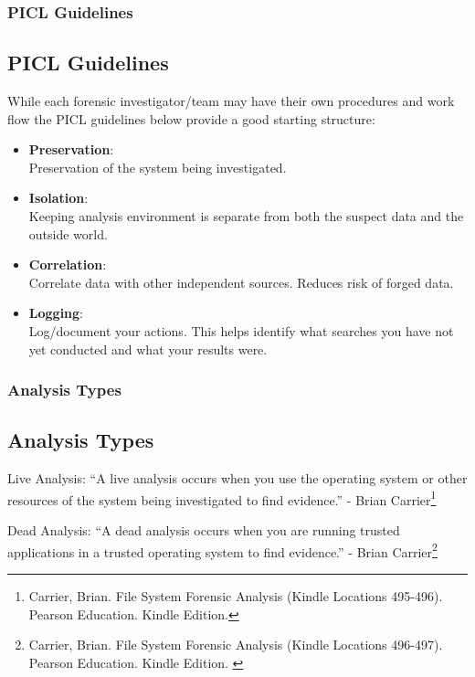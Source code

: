 \documentclass{beamer}
\begin{document}
\begin{frame}
	\frametitle{PICL Guidelines}
	\subsection*{PICL Guidelines}
	While each forensic investigator/team may have their own procedures and work flow the PICL guidelines below provide a good starting structure:\\
	\vspace{\baselineskip}
	\begin{itemize}
		\item \textbf{Preservation}:\\	 Preservation of the system being investigated.
		\item \textbf{Isolation}:\\	 Keeping analysis environment is separate from both the suspect data and the outside world.
		\item \textbf{Correlation}:\\	 Correlate data with other independent sources. Reduces risk of forged data.
		\item \textbf{Logging}:\\	 Log/document your actions. This helps identify what searches you have not yet conducted and what your results were.
	\end{itemize}
\end{frame}

\begin{frame}
	\frametitle{Analysis Types}
	\subsection*{Analysis Types}
	\begin{block}{Live Analysis:}
		``A live analysis occurs when you use the operating system or other resources of the system being investigated to find evidence.'' - Brian Carrier\footnote{\tiny{Carrier, Brian. File System Forensic Analysis (Kindle Locations 495-496). Pearson Education. Kindle Edition.}}
	\end{block}

	\begin{block}{Dead Analysis:}
		``A dead analysis occurs when you are running trusted applications in a trusted operating system to find evidence.'' - Brian Carrier\footnote{\tiny{Carrier, Brian. File System Forensic Analysis (Kindle Locations 496-497). Pearson Education. Kindle Edition. }}
	\end{block}
\end{frame}
\end{document}
